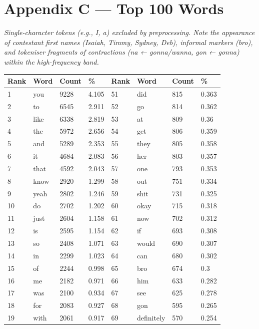 \documentclass[11pt]{article}
\begin{document}
\FloatBarrier
\needspace{0.9\textheight}
\section*{Appendix C --- Top 100 Words}

\emph{Single-character tokens (e.g., I, a) excluded by preprocessing. Note the appearance of contestant first names (Isaiah, Timmy, Sydney, Deb), informal markers (bro), and tokeniser fragments of contractions (na ← gonna/wanna, gon ← gonna) within the high-frequency band.}

\begin{center}
\footnotesize\setlength{\tabcolsep}{4pt}
\begin{tabular}{llllllll}
\toprule
Rank & Word & Count & \% & Rank & Word & Count & \% \\
\midrule
1 & you & 9228 & 4.105 & 51 & did & 815 & 0.363 \\
2 & to & 6545 & 2.911 & 52 & go & 814 & 0.362 \\
3 & like & 6338 & 2.819 & 53 & at & 809 & 0.36 \\
4 & the & 5972 & 2.656 & 54 & get & 806 & 0.359 \\
5 & and & 5289 & 2.353 & 55 & they & 805 & 0.358 \\
6 & it & 4684 & 2.083 & 56 & her & 803 & 0.357 \\
7 & that & 4592 & 2.043 & 57 & one & 793 & 0.353 \\
8 & know & 2920 & 1.299 & 58 & out & 751 & 0.334 \\
9 & yeah & 2802 & 1.246 & 59 & shit & 731 & 0.325 \\
10 & do & 2702 & 1.202 & 60 & okay & 715 & 0.318 \\
11 & just & 2604 & 1.158 & 61 & now & 702 & 0.312 \\
12 & is & 2595 & 1.154 & 62 & if & 693 & 0.308 \\
13 & so & 2408 & 1.071 & 63 & would & 690 & 0.307 \\
14 & in & 2299 & 1.023 & 64 & can & 680 & 0.302 \\
15 & of & 2244 & 0.998 & 65 & bro & 674 & 0.3 \\
16 & me & 2182 & 0.971 & 66 & him & 633 & 0.282 \\
17 & was & 2100 & 0.934 & 67 & see & 625 & 0.278 \\
18 & for & 2083 & 0.927 & 68 & gon & 595 & 0.265 \\
19 & with & 2061 & 0.917 & 69 & definitely & 570 & 0.254 \\

\end{tabular}
\end{center}
\end{document}
